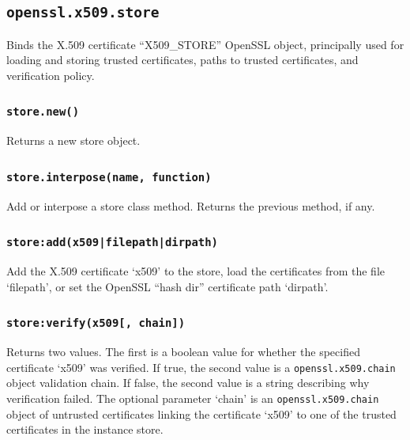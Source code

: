 \documentclass[11pt, oneside]{memoir}
\newcommand*{\fn}[1]{\texttt{#1}\xspace}
\newcommand*{\module}[1]{\texttt{#1}\xspace}
\newcounter{toccols}
\newenvironment{Module}[1]{
	\subsection{\texttt{#1}}
	\addtocontents{toc}{
		\protect\begin{multicols}{\value{toccols}}
	}
}{
	\addtocontents{toc}{\protect\end{multicols}}
}
\begin{document}
\begin{Module}{openssl.x509.store}

Binds the X.509 certificate ``X509\_STORE'' OpenSSL object, principally used for loading and storing trusted certificates, paths to trusted certificates, and verification policy.

\subsubsection[\fn{store.new}]{\fn{store.new()}}

Returns a new store object.

\subsubsection[\fn{store.interpose}]{\fn{store.interpose(name, function)}}

Add or interpose a store class method. Returns the previous method, if any.

\subsubsection[\fn{store:add}]{\fn{store:add(x509|filepath|dirpath)}}

Add the X.509 certificate `x509' to the store, load the certificates from the file `filepath', or set the OpenSSL ``hash dir'' certificate path `dirpath'.

\subsubsection[\fn{store:verify}]{\fn{store:verify(x509[, chain])}}

Returns two values. The first is a boolean value for whether the specified certificate `x509' was verified. If true, the second value is a  \module{openssl.x509.chain} object validation chain. If false, the second value is a string describing why verification failed. The optional parameter `chain' is an \module{openssl.x509.chain} object of untrusted certificates linking the certificate `x509' to one of the trusted certificates in the instance store.

\end{Module}
\end{document}
